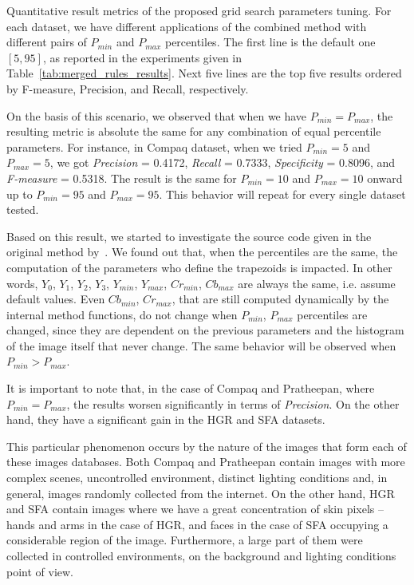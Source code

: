 \begin{table*}[ht]
\caption[Quantitative result metrics of the proposed grid search parameters tuning]{Quantitative result metrics of the proposed grid search parameters tuning. For each dataset, we have different applications of the combined method with different pairs of $P_{min}$ and $P_{max}$ percentiles. The first line is the default one $[5, 95]$, as reported in the experiments given in Table~\ref{tab:merged_rules_results}. Next five lines are the top five results ordered by F-measure, Precision, and Recall, respectively.}
\label{tab:gs_results_comparison}

\end{table*}

On the basis of this scenario, we observed that when we have $P_{min} = P_{max}$, the resulting metric is absolute the same for any combination of equal percentile parameters. For instance, in Compaq dataset, when we tried $P_{min} = 5$ and $P_{max} = 5$, we got \emph{Precision} = 0.4172, \emph{Recall} = 0.7333, \emph{Specificity} = 0.8096, and \emph{F-measure} = 0.5318. The result is the same for $P_{min} = 10$ and $P_{max} = 10$ onward up to $P_{min} = 95$ and $P_{max} = 95$. This behavior will repeat for every single dataset tested.

Based on this result, we started to investigate the source code given in the original method by~\citet{brancati:17}. We found out that, when the percentiles are the same, the computation of the parameters who define the trapezoids is impacted. In other words, $Y_0$, $Y_1$, $Y_2$, $Y_3$, $Y_{min}$, $Y_{max}$, $Cr_{min}$, $Cb_{max}$ are always the same, i.e. assume default values. Even $Cb_{min}$, $Cr_{max}$, that are still computed dynamically by the internal method functions, do not change when $P_{min}$, $P_{max}$ percentiles are changed, since they are dependent on the previous parameters and the histogram of the image itself that never change. The same behavior will be observed when $P_{min} > P_{max}$.

It is important to note that, in the case of Compaq and Pratheepan, where $P_{min} = P_{max}$, the results worsen significantly in terms of \emph{Precision}. On the other hand, they have a significant gain in the HGR and SFA datasets.

This particular phenomenon occurs by the nature of the images that form each of these images databases. Both Compaq and Pratheepan contain images with more complex scenes, uncontrolled environment, distinct lighting conditions and, in general, images randomly collected from the internet. On the other hand, HGR and SFA contain images where we have a great concentration of skin pixels -- hands and arms in the case of HGR, and faces in the case of SFA occupying a considerable region of the image. Furthermore, a large part of them were collected in controlled environments, on the background and lighting conditions point of view.

